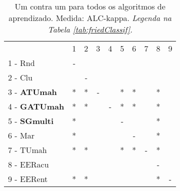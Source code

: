 \begin{table}[h]
\caption{Um contra um para todos os algoritmos de aprendizado. Medida: ALC-kappa. \textit{Legenda na Tabela \ref{tab:friedClassif}.}}
\begin{center}\begin{tabular}{lcc|cc|cc|cc|c}
 			& 1 & 2 & 3 & 4 & 5 & 6 & 7 & 8 & 9\\
1 - Rnd  	& - &   &   &   &   &   &   &   &   \\
2 - Clu  	&   & - &   &   &   &   &   &   &   \\ \hline
3 - \textbf{ATUmah}	& * & * & - &   & * & * &   & * &   \\
4 - \textbf{GATUmah}	& * & * &   & - & * & * &   & * &   \\ \hline
5 - \textbf{SGmulti}	& * &   &   &   & - &   &   & * &   \\
6 - Mar  	& * &   &   &   &   & - &   & * &   \\ \hline
7 - TUmah	& * & * &   &   & * & * & - & * &   \\
8 - EERacu	&   &   &   &   &   &   &   & - &   \\ \hline
9 - EERent	& * & * &   &   &   &   &   & * & - \\\end{tabular}
\label{stratsALCKappaFriedAllReduxhalf}
\end{center}
\end{table}